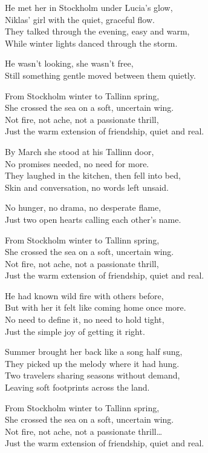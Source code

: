 \begin{lyrics}
He met her in Stockholm under Lucia’s glow,\\
Niklas’ girl with the quiet, graceful flow.\\
They talked through the evening, easy and warm,\\
While winter lights danced through the storm.

He wasn’t looking, she wasn’t free,\\
Still something gentle moved between them quietly.

From Stockholm winter to Tallinn spring,\\
She crossed the sea on a soft, uncertain wing.\\
Not fire, not ache, not a passionate thrill,\\
Just the warm extension of friendship, quiet and real.

By March she stood at his Tallinn door,\\
No promises needed, no need for more.\\
They laughed in the kitchen, then fell into bed,\\
Skin and conversation, no words left unsaid.

No hunger, no drama, no desperate flame,\\
Just two open hearts calling each other’s name.

From Stockholm winter to Tallinn spring,\\
She crossed the sea on a soft, uncertain wing.\\
Not fire, not ache, not a passionate thrill,\\
Just the warm extension of friendship, quiet and real.

He had known wild fire with others before,\\
But with her it felt like coming home once more.\\
No need to define it, no need to hold tight,\\
Just the simple joy of getting it right.

Summer brought her back like a song half sung,\\
They picked up the melody where it had hung.\\
Two travelers sharing seasons without demand,\\
Leaving soft footprints across the land.

From Stockholm winter to Tallinn spring,\\
She crossed the sea on a soft, uncertain wing.\\
Not fire, not ache, not a passionate thrill…\\
Just the warm extension of friendship, quiet and real.
\end{lyrics}


